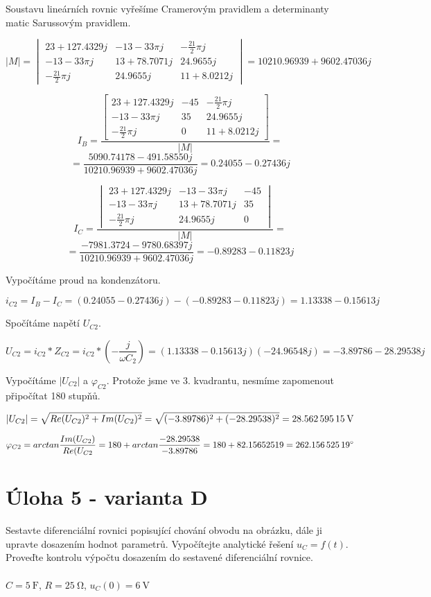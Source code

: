 \documentclass[11pt]{article}
\begin{document}
Soustavu lineárních rovnic vyřešíme Cramerovým pravidlem a determinanty matic Sarussovým pravidlem.

\[
	|M| = 
		\begin{vmatrix}
		23 + 127.4329j & -13 - 33{\pi}j & -\frac{21}{2}{\pi}j \\
		-13 - 33{\pi}j & 13 + 78.7071j & 24.9655j \\
		-\frac{21}{2}{\pi}j & 24.9655j & 11 + 8.0212j
		\end{vmatrix}
		= 10210.96939 + 9602.47036j
\]

\[
I_B = 
\frac
{
	\begin{bmatrix}
	23 + 127.4329j & -45 & -\frac{21}{2}{\pi}j \\
	-13 - 33{\pi}j & 35 & 24.9655j \\
	-\frac{21}{2}{\pi}j & 0 & 11 + 8.0212j
	\end{bmatrix}
}
{
	|M|
} 
= \]
\[= \frac{5090.74178 - 491.58550j}{10210.96939 + 9602.47036j} = 0.24055 - 0.27436j
\]

\[
I_C =
\frac
{
	\begin{vmatrix}
	23 + 127.4329j & -13 - 33{\pi}j & -45 \\
	-13 - 33{\pi}j & 13 + 78.7071j & 35 \\
	-\frac{21}{2}{\pi}j & 24.9655j & 0
	\end{vmatrix}
}
{
	|M|
} 
= \]
\[= \frac{-7981.3724 - 9780.68397j}{10210.96939 + 9602.47036j} = -0.89283 - 0.11823j
\]

Vypočítáme proud na kondenzátoru.

\[i_{C2} = I_B - I_C = (0.24055 - 0.27436j) - (-0.89283 - 0.11823j) = 1.13338 - 0.15613j\]

Spočítáme napětí \( U_{C2} \).

\[U_{C2} = i_{C2} * Z_{C2} = i_{C2} * (-\frac{j}{{\omega}C_2}) = (1.13338 - 0.15613j)(-24.96548j) = -3.89786 - 28.29538j\]

Vypočítáme \(|U_{C2}|\) a \({\varphi}_{C2}\). Protože jsme ve 3. kvadrantu, nesmíme zapomenout připočítat 180 stupňů.

\[ |U_{C2}| = \sqrt{Re(U_{C2})^2 + Im(U_{C2})^2} = \sqrt{(-3.89786)^2 + (-28.29538)^2} = \textbf{\SI{28.56259515}{\volt}}\] 

\[ {\varphi}_{C2} = arctan\frac{Im(U_{C2})}{Re(U_{C2}} = 180 + arctan\frac{-28.29538}{-3.89786} = 180 + 82.15652519 = \textbf{\ang{262.15652519}}\]



\newpage
\section{Úloha 5 - varianta D}
Sestavte diferenciální rovnici popisující chování obvodu na obrázku, dále ji upravte dosazením hodnot parametrů. Vypočítejte analytické řešení \(u_C = f(t) \). Proveďte kontrolu výpočtu dosazením do sestavené diferenciální rovnice.
\\
\\
\(C = \SI{5}{\farad}\),
\(R = \SI{25}{\ohm}\),
\(u_C(0) = \SI{6}{\volt} \)
\end{document}
